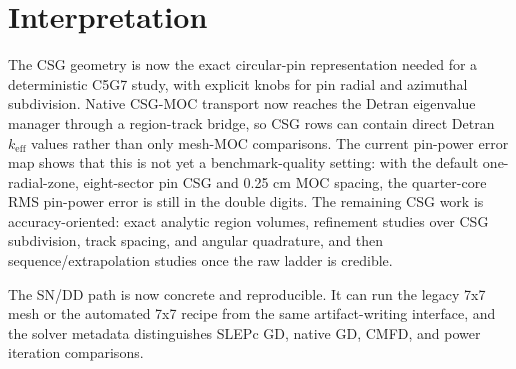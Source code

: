 \documentclass[11pt]{article}
\begin{document}
\section*{Interpretation}

The CSG geometry is now the exact circular-pin representation needed for a
deterministic C5G7 study, with explicit knobs for pin radial and azimuthal
subdivision.  Native CSG-MOC transport now reaches the Detran eigenvalue manager
through a region-track bridge, so CSG rows can contain direct Detran
$k_{\mathrm{eff}}$ values rather than only mesh-MOC comparisons.  The current
pin-power error map shows that this is not yet a benchmark-quality setting:
with the default one-radial-zone, eight-sector pin CSG and 0.25 cm MOC spacing,
the quarter-core RMS pin-power error is still in the double digits.  The
remaining CSG work is accuracy-oriented: exact analytic region volumes,
refinement studies over CSG subdivision, track spacing, and angular quadrature,
and then sequence/extrapolation studies once the raw ladder is credible.

The SN/DD path is now concrete and reproducible.  It can run the legacy
7x7 mesh or the automated 7x7 recipe from the same artifact-writing interface,
and the solver metadata distinguishes SLEPc GD, native GD, CMFD, and power
iteration comparisons.
\end{document}
